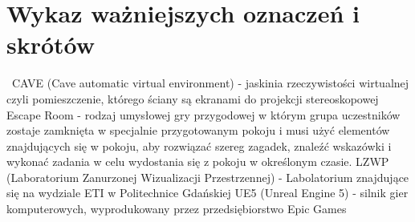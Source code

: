 \chapter*{Wykaz ważniejszych oznaczeń i skrótów}
\
CAVE (Cave automatic virtual environment) - jaskinia  rzeczywistości wirtualnej czyli pomieszczenie, którego ściany są ekranami do projekcji stereoskopowej
\newline
\newline
Escape Room - rodzaj umysłowej gry przygodowej w którym grupa uczestników zostaje zamknięta w specjalnie          przygotowanym pokoju i musi użyć elementów znajdujących się w pokoju, aby rozwiązać szereg zagadek, znaleźć wskazówki i wykonać zadania w celu wydostania się z pokoju w określonym czasie.
\newline
\newline
LZWP (Laboratorium Zanurzonej Wizualizacji Przestrzennej) - Labolatorium znajdujące się na wydziale ETI w Politechnice Gdańskiej
\newline
\newline
UE5 (Unreal Engine 5) - silnik gier komputerowych, wyprodukowany przez przedsiębiorstwo Epic Games


